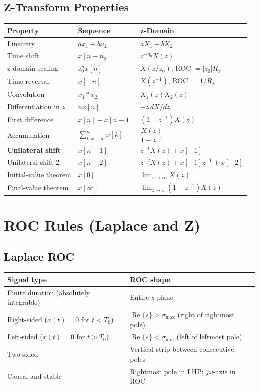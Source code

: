 \documentclass{article}
\begin{document}
\subsection{Z-Transform Properties}

\begin{center}
\begin{tabular}{lll}
\toprule
Property & Sequence & z-Domain \\
\midrule
Linearity & $ax_1+bx_2$ & $aX_1+bX_2$ \\
Time shift & $x[n-n_0]$ & $z^{-n_0}X(z)$ \\
z-domain scaling & $z_0^n x[n]$ & $X(z/z_0)$, ROC $=|z_0|R_x$ \\
Time reversal & $x[-n]$ & $X(z^{-1})$, ROC $=1/R_x$ \\
Convolution & $x_1*x_2$ & $X_1(z)X_2(z)$ \\
Differentiation in $z$ & $nx[n]$ & $-z\,dX/dz$ \\
First difference & $x[n]-x[n-1]$ & $(1-z^{-1})X(z)$ \\
Accumulation & $\sum_{k=-\infty}^n x[k]$ & $\dfrac{X(z)}{1-z^{-1}}$ \\
\textbf{Unilateral shift} & $x[n-1]$ & $z^{-1}X(z)+x[-1]$ \\
Unilateral shift-2 & $x[n-2]$ & $z^{-2}X(z)+x[-1]z^{-1}+x[-2]$ \\
Initial-value theorem & $x[0]$ & $\lim_{z\to\infty} X(z)$ \\
Final-value theorem & $x[\infty]$ & $\lim_{z\to 1}(1-z^{-1})X(z)$ \\
\bottomrule
\end{tabular}
\end{center}

\section{ROC Rules (Laplace and Z)}

\subsection{Laplace ROC}

\begin{center}
\begin{tabular}{ll}
\toprule
Signal type & ROC shape \\
\midrule
Finite duration (absolutely integrable) & Entire $s$-plane \\
Right-sided ($x(t)=0$ for $t<T_0$) & $\operatorname{Re}\{s\} > \sigma_{\max}$ (right of rightmost pole) \\
Left-sided ($x(t)=0$ for $t>T_0$) & $\operatorname{Re}\{s\} < \sigma_{\min}$ (left of leftmost pole) \\
Two-sided & Vertical strip between consecutive poles \\
Causal and stable & Rightmost pole in LHP; $j\omega$-axis in ROC \\
\bottomrule
\end{tabular}
\end{center}
\end{document}
